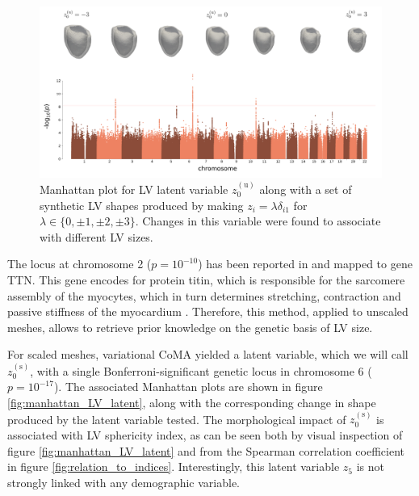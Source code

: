 \begin{figure}[ht!]
\includegraphics[width=\textwidth]{figs/gwas/GWAS_Experiment2_z0u_unscaled_meshes.png}
\caption{Manhattan plot for LV latent variable $z_0^{(\text{u})}$ along with a set of synthetic LV shapes produced by making $z_i=\lambda \delta_{i1}$ for $\lambda\in\{0, \pm 1, \pm 2, \pm 3\}$. Changes in this variable were found to associate with different LV sizes.}
\label{fig:manhattan_LV_latent_unscaled}
\end{figure}

The locus at chromosome 2 ($p=10^{-10}$) has been reported in  \cite{ref_nayaung, ref_pirruccello} and mapped to gene TTN. This gene encodes for protein titin, which is  responsible  for  the  sarcomere  assembly of the myocytes, which in turn determines stretching, contraction and passive stiffness of the myocardium \cite{granzier_giant_2004}. Therefore, this method, applied to unscaled meshes, allows to retrieve prior knowledge on the genetic basis of LV size.

For scaled meshes, variational CoMA yielded a latent variable, which we will call $z_0^{(\text{s})}$, with a single Bonferroni-significant genetic locus in chromosome 6 ($p=10^{-17}$). The associated Manhattan plots are shown in figure \ref{fig:manhattan_LV_latent}, along with the corresponding change in shape produced by the latent variable tested. The morphological impact of $z_0^{(\text{s})}$ is associated with LV sphericity index, as can be seen both by visual inspection of figure \ref{fig:manhattan_LV_latent} and from the Spearman correlation coefficient in figure \ref{fig:relation_to_indices}. Interestingly, this latent variable $z_5$ is not strongly linked with any demographic variable.

